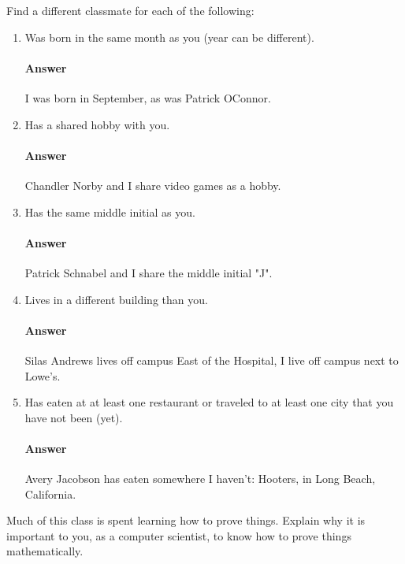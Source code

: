 \documentclass{article}
\begin{document}
Find a different classmate for each of the following:
\begin{enumerate}
    \item Was born in the same month as you (year can be different).
        \paragraph{Answer} 
        I was born in September, as was Patrick OConnor.

    \item Has a shared hobby with you.
        \paragraph{Answer} 
        Chandler Norby and I share video games as a hobby.

    \item Has the same middle initial as you.
        \paragraph{Answer} 
        Patrick Schnabel and I share the middle initial "J".

    \item Lives in a different building than you.
        \paragraph{Answer} Silas Andrews lives off campus East of the Hospital, I live off campus next to Lowe's.

    \item Has eaten at at least one restaurant or traveled to at least one city that you have not been
        (yet).
        \paragraph{Answer} Avery Jacobson has eaten somewhere I haven't: Hooters, in Long Beach, California.

\end{enumerate}


Much of this class is spent learning how to prove things.  Explain why it is
important to you, as a computer scientist, to know how to prove things
mathematically.
\end{document}
